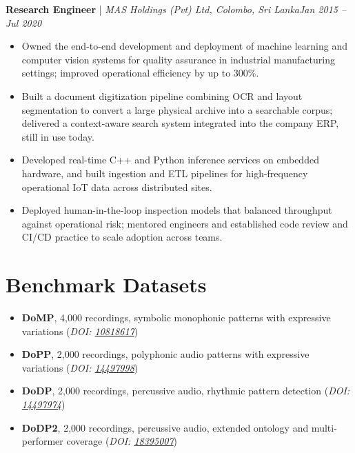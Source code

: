 \documentclass[11pt]{article}
\newenvironment{cvrole}[5]{%
  \par\noindent\textbf{\large #1} | \textit{\small #2, #3}\hfill \textit{\small #4 -- #5}\par
  \begin{itemize}[leftmargin=2em, itemsep=-0.3em, topsep=-0.4em]%
}{%
  \end{itemize}\par\noindent\mbox{}\par\vspace{-0.1em}%
}
\begin{document}
\begin{cvrole}{Research Engineer}{MAS Holdings (Pvt) Ltd}{Colombo, Sri Lanka}{Jan 2015}{Jul 2020}
    \item Owned the end-to-end development and deployment of machine learning and computer vision systems for quality assurance in industrial manufacturing settings; improved operational efficiency by up to 300\%.
    \item Built a document digitization pipeline combining OCR and layout segmentation to convert a large physical archive into a searchable corpus; delivered a context-aware search system integrated into the company ERP, still in use today.
    \item Developed real-time C++ and Python inference services on embedded hardware, and built ingestion and ETL pipelines for high-frequency operational IoT data across distributed sites.
    \item Deployed human-in-the-loop inspection models that balanced throughput against operational risk; mentored engineers and established code review and CI/CD practice to scale adoption across teams.
\end{cvrole}

\section*{Benchmark Datasets \footnotesize {}}
\begin{itemize}[leftmargin=1.2em, itemsep=-0.25em]

    \item \textbf{DoMP}, 4,000 recordings, symbolic monophonic patterns with expressive variations (\textit{DOI: \href{https://doi.org/10.5281/zenodo.10818617}{\textit{10818617}}})
    \item \textbf{DoPP}, 2,000 recordings, polyphonic audio patterns with expressive variations (\textit{DOI: \href{https://doi.org/10.5281/zenodo.14497998}{\textit{14497998}}})
    \item \textbf{DoDP}, 2,000 recordings, percussive audio, rhythmic pattern detection (\textit{DOI: \href{https://doi.org/10.5281/zenodo.14497974}{\textit{14497974}}})
    \item \textbf{DoDP2}, 2,000 recordings, percussive audio, extended ontology and multi-performer coverage (\textit{DOI: \href{https://doi.org/10.5281/zenodo.18395007}{\textit{18395007}}})
\end{itemize}
\end{document}
